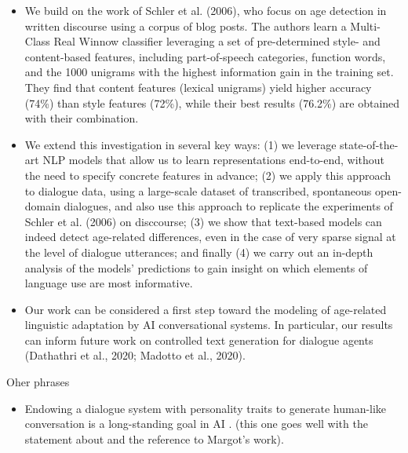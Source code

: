 \begin{itemize}
    \item We build on the work of Schler et al. (2006), who focus on age detection in written discourse using a   corpus of blog posts. The authors learn a Multi-Class Real Winnow classifier leveraging a set of pre-determined style- and content-based features, including part-of-speech categories, function words, and the 1000 unigrams with the highest information gain in the training set. They find that content features (lexical unigrams) yield higher accuracy (74\%) than style features (72\%), while their best results (76.2\%) are obtained with their combination. 
    \item We extend this investigation in several key ways: (1) we leverage state-of-the-art NLP models that allow us to learn representations end-to-end, without the need to specify concrete features in advance; (2) we apply this approach to dialogue data, using a large-scale dataset of transcribed, spontaneous open-domain dialogues, and also use this approach to replicate the experiments of Schler et al. (2006) on disccourse; (3) we show that text-based models can indeed detect age-related differences, even in the case of very sparse signal at the level of dialogue utterances; and finally (4) we carry out an in-depth analysis of the models’ predictions to gain insight on which elements of language use are most informative. 
    \item Our work can be considered a first step toward the modeling of age-related linguistic adaptation by AI conversational systems. In particular, our results can inform future work on controlled text generation for dialogue agents (Dathathri et al., 2020; Madotto et al., 2020).
\end{itemize}

Oher phrases

\begin{itemize}
    \item Endowing a dialogue system with personality traits to generate human-like conversation is a long-standing goal in AI \citep{edlund2008towards, scheutz2011toward}. (this one goes well with the statement about and the reference to Margot's work).
\end{itemize}